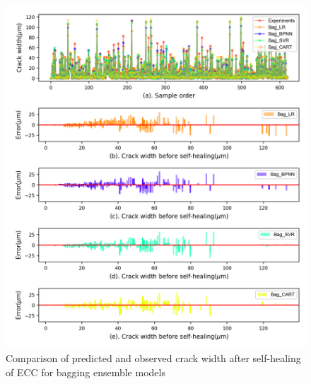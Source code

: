 \documentclass[11pt]{article}
\begin{document}
	\begin{figure}[!h]
		\centering
		\includegraphics[width=\textwidth]{bagError.png}
		\caption{Comparison of predicted and observed crack width after self-healing of ECC for bagging ensemble models}
		\label{error2}
	\end{figure}
	
\end{document}
